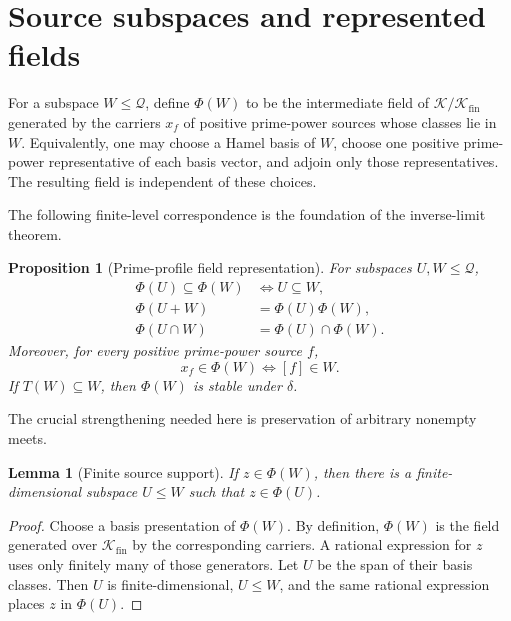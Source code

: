 \documentclass[11pt]{article}
\newtheorem{proposition}[theorem]{Proposition}
\newtheorem{lemma}[theorem]{Lemma}
\theoremstyle{definition}
\theoremstyle{remark}
\newcommand{\K}{\mathcal K}
\newcommand{\Kfin}{\mathcal K_{\mathrm{fin}}}
\newcommand{\Q}{\mathcal Q}
\begin{document}
\section{Source subspaces and represented fields}\label{sec:grassmann}

For a subspace $W\leq\Q$, define $\Phi(W)$ to be the intermediate field of $\K/\Kfin$ generated
by the carriers $x_f$ of positive prime-power sources whose classes lie in $W$.  Equivalently, one
may choose a Hamel basis of $W$, choose one positive prime-power representative of each basis
vector, and adjoin only those representatives.  The resulting field is independent of these
choices.

The following finite-level correspondence is the foundation of the inverse-limit theorem.

\begin{proposition}[Prime-profile field representation]\label{prop:representation}
For subspaces $U,W\leq\Q$,
\begin{align}
  \Phi(U)\subseteq\Phi(W)&\Longleftrightarrow U\subseteq W,      \tag{3.1}\\
  \Phi(U+W)&=\Phi(U)\Phi(W),                                    \tag{3.2}\\
  \Phi(U\cap W)&=\Phi(U)\cap\Phi(W).                            \tag{3.3}
\end{align}
Moreover, for every positive prime-power source $f$,
\[
  x_f\in\Phi(W)\Longleftrightarrow [f]\in W.                   \tag{3.4}
\]
If $T(W)\subseteq W$, then $\Phi(W)$ is stable under $\delta$.
\end{proposition}

The crucial strengthening needed here is preservation of arbitrary nonempty meets.

\begin{lemma}[Finite source support]\label{lem:finite-source}
If $z\in\Phi(W)$, then there is a finite-dimensional subspace $U\leq W$ such that
$z\in\Phi(U)$.
\end{lemma}

\begin{proof}
Choose a basis presentation of $\Phi(W)$.  By definition, $\Phi(W)$ is the field generated over
$\Kfin$ by the corresponding carriers.  A rational expression for $z$ uses only finitely many of
those generators.  Let $U$ be the span of their basis classes.  Then $U$ is finite-dimensional,
$U\leq W$, and the same rational expression places $z$ in $\Phi(U)$.
\end{proof}
\end{document}
